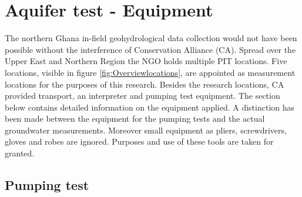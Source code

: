 \chapter{Aquifer test - Equipment}
\label{chapter:fieldwork_set-up}

The northern Ghana in-field geohydrological data collection would not have been possible without the interference of Conservation Alliance (CA). Spread over the Upper East and Northern Region the NGO holds multiple PIT locations. Five locations, visible in figure \ref{fig:Overviewlocations}, are appointed as measurement locations for the purposes of this research.
Besides the research locations, CA provided transport, an interpreter and pumping test equipment. The section below contains detailed information on the equipment applied. A distinction has been made between the equipment for the pumping tests and the actual groundwater measurements. Moreover small equipment as pliers, screwdrivers, gloves and robes are ignored. Purposes and use of these tools are taken for granted.\\

\section{Pumping test} 

